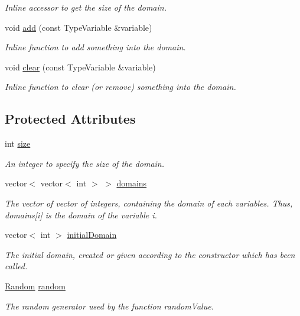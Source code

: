 \begin{DoxyCompactItemize}
\begin{DoxyCompactList}\small\item\em Inline accessor to get the size of the domain. \end{DoxyCompactList}\item 
void \hyperlink{classghost_1_1Domain_aa9386317ee6ca064d1e2018acefaf8bb}{add} (const Type\-Variable \&variable)
\begin{DoxyCompactList}\small\item\em Inline function to add something into the domain. \end{DoxyCompactList}\item 
void \hyperlink{classghost_1_1Domain_ad3b39f88a7becd7c8c347c04963e3414}{clear} (const Type\-Variable \&variable)
\begin{DoxyCompactList}\small\item\em Inline function to clear (or remove) something into the domain. \end{DoxyCompactList}\end{DoxyCompactItemize}
\subsection*{Protected Attributes}
\begin{DoxyCompactItemize}
\item 
int \hyperlink{classghost_1_1Domain_a13e282f60c6c7cddf5b5716b45ad161c}{size}
\begin{DoxyCompactList}\small\item\em An integer to specify the size of the domain. \end{DoxyCompactList}\item 
vector$<$ vector$<$ int $>$ $>$ \hyperlink{classghost_1_1Domain_a6940f37aa773c6c94cff18cfe1e6a7f7}{domains}
\begin{DoxyCompactList}\small\item\em The vector of vector of integers, containing the domain of each variables. Thus, domains\mbox{[}i\mbox{]} is the domain of the variable i. \end{DoxyCompactList}\item 
vector$<$ int $>$ \hyperlink{classghost_1_1Domain_a8890ca1323c293a4a1e2aa1830eff043}{initial\-Domain}
\begin{DoxyCompactList}\small\item\em The initial domain, created or given according to the constructor which has been called. \end{DoxyCompactList}\item 
\hyperlink{classghost_1_1Random}{Random} \hyperlink{classghost_1_1Domain_ab6a7a58f8a147f5b2b475e106627fad2}{random}
\begin{DoxyCompactList}\small\item\em The random generator used by the function random\-Value. \end{DoxyCompactList}\end{DoxyCompactItemize}
